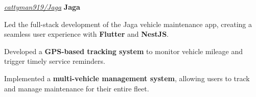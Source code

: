 \documentclass[../main.tex]{subfiles}
\begin{document}
\vspace{0.2 cm}

\begin{twocolentry}{
    \small
    \textit{\href{https://github.com/cattyman919/Jaga}{cattyman919/Jaga}}
}
    \textbf{Jaga}
\end{twocolentry}

\vspace{0.10 cm}
\begin{onecolentry}
\begin{highlights}
    \item Led the full-stack development of the Jaga vehicle maintenance app, creating a seamless user experience with \textbf{Flutter} and \textbf{NestJS}.
    \item Developed a \textbf{GPS-based tracking system} to monitor vehicle mileage and trigger timely service reminders.
    \item Implemented a \textbf{multi-vehicle management system}, allowing users to track and manage maintenance for their entire fleet.
\end{highlights}
\end{onecolentry}
\end{document}
